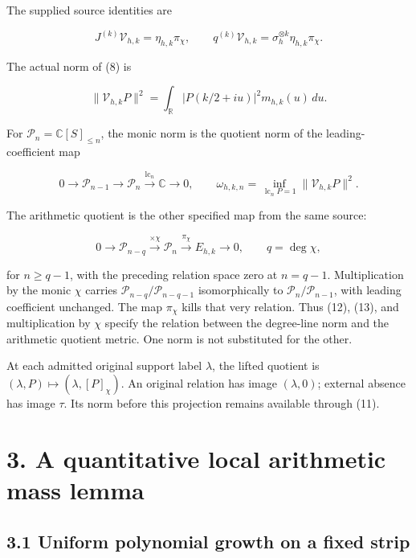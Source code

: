\documentclass[11pt,a4paper]{article}
\begin{document}
The supplied source identities are

\[
 J^{(k)}\mathcal V_{h,k}=\eta_{h,k}\pi_\chi,\qquad
 q^{(k)}\mathcal V_{h,k}=\sigma_h^{\otimes k}\eta_{h,k}\pi_\chi.          \tag{10}
\]

The actual norm of (8) is

\[
 \|\mathcal V_{h,k}P\|^2
 =\int_{\mathbb R}|P(k/2+iu)|^2m_{h,k}(u)\,du.                          \tag{11}
\]

For \(\mathcal P_n=\mathbb C[S]_{\le n}\), the monic norm is the
quotient norm of the leading-coefficient map

\[
 0\longrightarrow\mathcal P_{n-1}\longrightarrow\mathcal P_n
 \xrightarrow{\operatorname{lc}_n}\mathbb C\longrightarrow0,
 \qquad
 \omega_{h,k,n}=\inf_{\operatorname{lc}_nP=1}\|\mathcal V_{h,k}P\|^2.
                                                                         \tag{12}
\]

The arithmetic quotient is the other specified map from the same source:

\[
 0\longrightarrow\mathcal P_{n-q}
 \xrightarrow{\times\chi}\mathcal P_n
 \xrightarrow{\pi_\chi}E_{h,k}\longrightarrow0,\qquad q=\deg\chi,
                                                                         \tag{13}
\]

for \(n\ge q-1\), with the preceding relation space zero at \(n=q-1\).
Multiplication by the monic \(\chi\) carries
\(\mathcal P_{n-q}/\mathcal P_{n-q-1}\) isomorphically to
\(\mathcal P_n/\mathcal P_{n-1}\), with leading coefficient unchanged.
The map \(\pi_\chi\) kills that very relation. Thus (12), (13), and
multiplication by \(\chi\) specify the relation between the degree-line
norm and the arithmetic quotient metric. One norm is not substituted for
the other.

At each admitted original support label \(\lambda\), the lifted quotient
is \((\lambda,P)\mapsto(\lambda,[P]_\chi)\). An original relation has
image \((\lambda,0)\); external absence has image \(\tau\). Its norm
before this projection remains available through (11).

\section{3. A quantitative local arithmetic mass
lemma}\label{a-quantitative-local-arithmetic-mass-lemma}

\subsection{3.1 Uniform polynomial growth on a fixed
strip}\label{uniform-polynomial-growth-on-a-fixed-strip}
\end{document}
